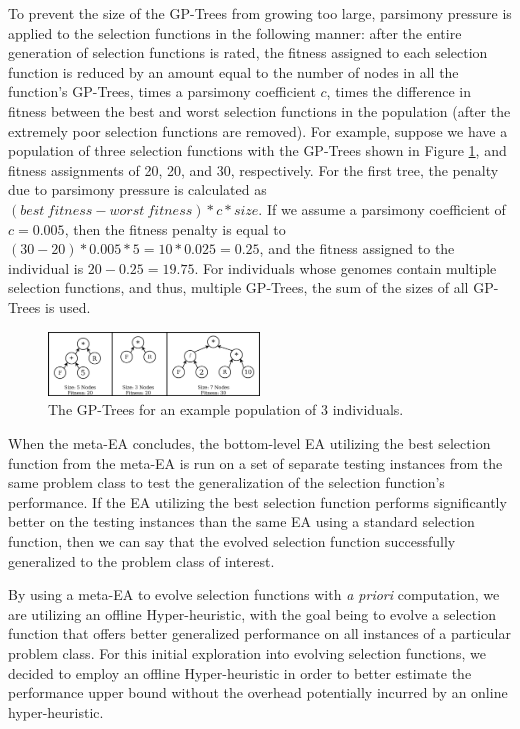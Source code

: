 \documentclass[sigconf]{acmart}
\begin{document}
To prevent the size of the GP-Trees from growing too large, parsimony pressure is applied to the selection functions in the following manner: after the entire generation of selection functions is rated, the fitness assigned to each selection function is reduced by an amount equal to the number of nodes in all the function's GP-Trees, times a parsimony coefficient $c$, times the difference in fitness between the best and worst selection functions in the population (after the extremely poor selection functions are removed). For example, suppose we have a population of three selection functions with the GP-Trees shown in Figure \ref{fig:parsimony_example}, and fitness assignments of 20, 20, and 30, respectively. For the first tree, the penalty due to parsimony pressure is calculated as $(best\ fitness - worst\ fitness) * c * size$. If we assume a parsimony coefficient of $c = 0.005$, then the fitness penalty is equal to $(30 - 20) * 0.005 * 5 = 10 * 0.025 = 0.25$, and the fitness assigned to the individual is $20 - 0.25 = 19.75$. For individuals whose genomes contain multiple selection functions, and thus, multiple GP-Trees, the sum of the sizes of all GP-Trees is used.

\begin{figure}
	\centering
	\includegraphics[width=0.5\textwidth]{parsimony_example}
	\caption{The GP-Trees for an example population of 3 individuals.}
	\label{fig:parsimony_example}
\end{figure}

When the meta-EA concludes, the bottom-level EA utilizing the best selection function from the meta-EA is run on a set of separate testing instances from the same problem class to test the generalization of the selection function's performance. If the EA utilizing the best selection function performs significantly better on the testing instances than the same EA using a standard selection function, then we can say that the evolved selection function successfully generalized to the problem class of interest. 

By using a meta-EA to evolve selection functions with \textit{a priori} computation, we are utilizing an offline Hyper-heuristic, with the goal being to evolve a selection function that offers better generalized performance on all instances of a particular problem class. For this initial exploration into evolving selection functions, we decided to employ an offline Hyper-heuristic in order to better estimate the performance upper bound without the overhead potentially incurred by an online hyper-heuristic.
\end{document}
